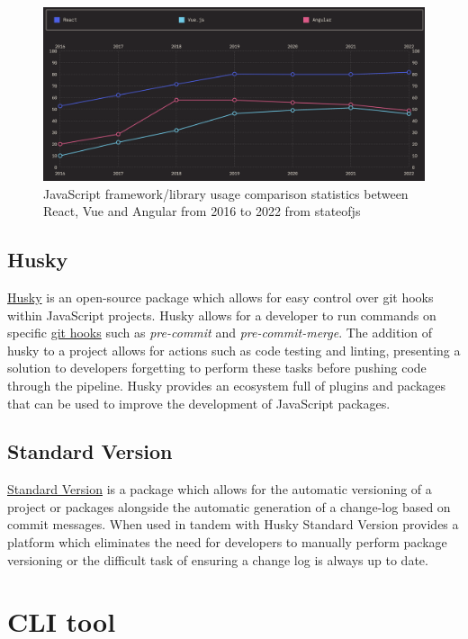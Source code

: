 \documentclass{l4proj}
\begin{document}
\begin{figure}[!ht]
    \centering
    \includegraphics[width=13cm]{dissertation/images/framework_popularity_comparison.png}
    \caption{JavaScript framework/library usage comparison statistics between React, Vue and Angular from 2016 to 2022 from stateofjs}
    \label{fig:js_framework_lib_comp}
\end{figure}

\subsection{Husky}
\href{https://typicode.github.io/husky/#/}{Husky} is an open-source package which allows for easy control over git hooks within JavaScript projects. Husky allows for a developer to run commands on specific \href{https://git-scm.com/docs/githooks}{git hooks} such as \textit{pre-commit} and \textit{pre-commit-merge}. The addition of husky to a project allows for actions such as code testing and linting, presenting a solution to developers forgetting to perform these tasks before pushing code through the pipeline. Husky provides an ecosystem full of plugins and packages that can be used to improve the development of JavaScript packages.

\subsection{Standard Version}
\href{https://github.com/conventional-changelog/standard-version#readme}{Standard Version} is a package which allows for the automatic versioning of a project or packages alongside the automatic generation of a change-log based on commit messages. When used in tandem with Husky Standard Version provides a platform which eliminates the need for developers to manually perform package versioning or the difficult task of ensuring a change log is always up to date.

\section{CLI tool}
\end{document}
